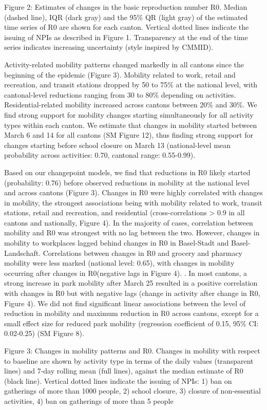 Figure 2: Estimates of changes in the basic reproduction number R0. Median (dashed line), IQR (dark gray) and the 95\% QR (light gray) of the estimated time series of R0 are shown for each canton. Vertical dotted lines indicate the issuing of NPIs as described in Figure 1. Transparency at the end of the time series indicates increasing uncertainty (style inspired by CMMID).


Activity-related mobility patterns changed markedly in all cantons since the beginning of the epidemic (Figure 3). Mobility related to work, retail and recreation, and transit stations dropped by 50 to 75\% at the national level, with cantonal-level reductions ranging from 30 to 80\% depending on activities. Residential-related mobility increased across cantons between 20\% and 30\%. We find strong support for mobility changes starting simultaneously for all activity types within each canton. We estimate that changes in mobility started between March 6 and 14 for all cantons (SM Figure 12), thus finding strong support for changes starting before school closure on March 13 (national-level mean probability across activities: 0.70, cantonal range: 0.55-0.99).

Based on our changepoint models, we find that reductions in R0 likely started (probability: 0.76) before observed reductions in mobility at the national level and across cantons (Figure 3). Changes in R0 were highly correlated with changes in mobility, the strongest associations being with mobility related to work, transit stations, retail and recreation, and residential (cross-correlations > 0.9 in all cantons and nationally, Figure 4). In the majority of cases, correlation between mobility and R0 was strongest with no lag between the two. However, changes in mobility to workplaces lagged behind changes in R0 in Basel-Stadt and Basel-Landschaft. Correlations between changes in R0 and grocery and pharmacy mobility were less marked (national level: 0.65), with changes in mobility occurring after changes in R0(negative lags in Figure 4). . In most cantons, a strong increase in park mobility after March 25 resulted in a positive correlation with changes in R0 but with negative lags (change in activity after change in R0, Figure 4). We did not find significant linear associations between the level of reduction in mobility and maximum reduction in R0 across cantons, except for a small effect size for reduced park mobility (regression coefficient of 0.15, 95\% CI: 0.02-0.25) (SM Figure 8).

Figure 3: Changes in mobility patterns and R0. Changes in mobility with respect to baseline are shown by activity type in terms of the daily values (transparent lines) and 7-day rolling mean (full lines), against the median estimate of R0 (black line). Vertical dotted lines indicate the issuing of NPIs: 1) ban on gatherings of more than 1000 people, 2) school closure, 3) closure of non-essential activities, 4) ban on gatherings of more than 5 people




